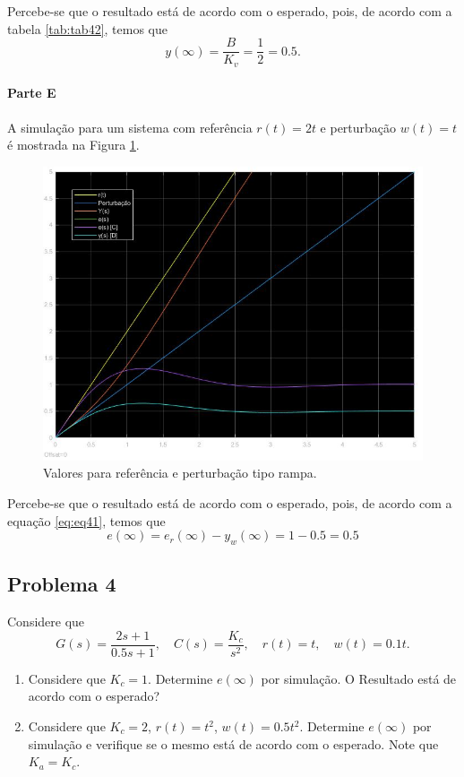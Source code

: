 \documentclass[
]{book}
\providecommand{\tightlist}{%
  \setlength{\itemsep}{0pt}\setlength{\parskip}{0pt}}
\begin{document}
Percebe-se que o resultado está de acordo com o esperado, pois, de acordo com a tabela \ref{tab:tab42}, temos que
\[
y(\infty) = \frac {B}{K_v} = \frac {1}{2} = 0.5.
\]

\hypertarget{parte-e}{%
\paragraph*{Parte E}\label{parte-e}}

A simulação para um sistema com referência \(r(t) = 2t\) e perturbação \(w(t) = t\) é mostrada na Figura \ref{fig:fig43E1}.

\begin{figure}
\includegraphics[width=0.8\linewidth]{Imagens/Lab4/Resolução/prob3E1} \caption{Valores para referência e perturbação tipo rampa.}\label{fig:fig43E1}
\end{figure}

Percebe-se que o resultado está de acordo com o esperado, pois, de acordo com a equação \eqref{eq:eq41}, temos que
\[
e(\infty) = e_r(\infty) - y_w(\infty) = 1 - 0.5 = 0.5
\]

\hypertarget{problema-4-1}{%
\subsection*{Problema 4}\label{problema-4-1}}

Considere que
\[
G(s) = \frac {2s +1}{0.5s+1}, \quad C(s) = \frac {K_c}{s^2}, \quad r(t) = t, \quad w(t) = 0.1t.
\]

\begin{enumerate}
\def\labelenumi{\alph{enumi}.}
\tightlist
\item
  Considere que \(K_c =1\). Determine \(e(\infty)\) por simulação. O Resultado está de acordo com o esperado?
\item
  Considere que \(K_c =2\), \(r(t) = t^2\), \(w(t) = 0.5t^2\). Determine \(e(\infty)\) por simulação e verifique se o mesmo está de acordo com o esperado. Note que \(K_a = K_c\).
\end{enumerate}
\end{document}
